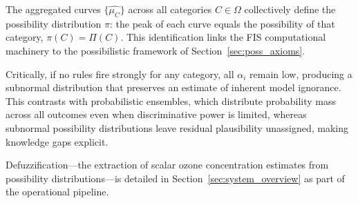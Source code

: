 The aggregated curves $\{\widehat{\mu_C}\}$ across all categories $C \in \Omega$ collectively define the possibility distribution $\pi$: the peak of each curve equals the possibility of that category, $\pi(C) = \Pi(C)$. This identification links the FIS computational machinery to the possibilistic framework of Section~\ref{sec:poss_axioms}.

Critically, if no rules fire strongly for any category, all $\alpha_i$ remain low, producing a subnormal distribution that preserves an estimate of inherent model ignorance. This contrasts with probabilistic ensembles, which distribute probability mass across all outcomes even when discriminative power is limited, whereas subnormal possibility distributions leave residual plausibility unassigned, making knowledge gaps explicit.

Defuzzification---the extraction of scalar ozone concentration estimates from possibility distributions---is detailed in Section~\ref{sec:system_overview} as part of the \clyfar{} operational pipeline.

